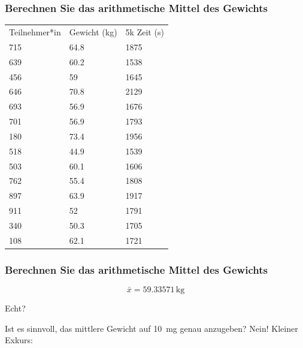 \documentclass{beamer}
\begin{document}
 
\begin{frame}
\frametitle{Berechnen Sie das arithmetische  Mittel des Gewichts}

\begin{tabular}{lll}
Teilnehmer*in   & Gewicht (kg)  &  5k Zeit (s)  \\
715 &	64.8 &	1875  \\
639 &	60.2 &	1538 \\
456 &	59 &	1645 \\
646 &	70.8 &	2129 \\
693 &	56.9 &	1676 \\
701 &	56.9 &	1793 \\
180 &	73.4 &	1956 \\
518 &	44.9 &	1539 \\
503 &	60.1 &	1606 \\
762 &	55.4 &	1808 \\
897 &	63.9 &	1917 \\
911 &	52 &	1791 \\
340 &	50.3 &	1705 \\
108 &	62.1 &	1721 \\
\end{tabular}



\end{frame}

\begin{frame}
\frametitle{Berechnen Sie das arithmetische  Mittel des Gewichts}

\[
\bar{x} = 59.33571\,\text{kg}
\]


\pause

Echt?

\pause

Ist es sinnvoll, das mittlere Gewicht auf \SI{10}{\milli\gram} genau anzugeben?  \pause Nein! Kleiner Exkurs:


\end{frame}






\begin{frame}
\end{frame}
\end{document}
